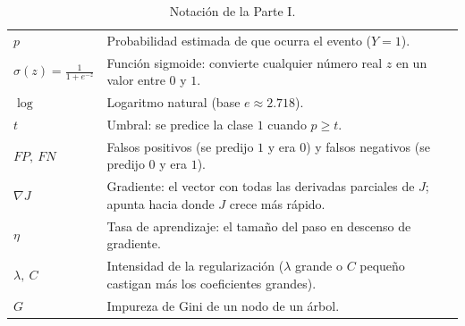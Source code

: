 \begin{table}[H]
\begin{tabular}{>{\raggedright\arraybackslash}p{3.2cm}>{\raggedright\arraybackslash}p{11.3cm}}
$p$ & Probabilidad estimada de que ocurra el evento ($Y=1$). \\
$\sigma(z)=\frac{1}{1+e^{-z}}$ & Función sigmoide: convierte cualquier
número real $z$ en un valor entre $0$ y $1$. \\
$\log$ & Logaritmo natural (base $e\approx2.718$). \\
$t$ & Umbral: se predice la clase $1$ cuando $p\ge t$. \\
$FP,\ FN$ & Falsos positivos (se predijo $1$ y era $0$) y falsos negativos
(se predijo $0$ y era $1$). \\
$\nabla J$ & Gradiente: el vector con todas las derivadas parciales de
$J$; apunta hacia donde $J$ crece más rápido. \\
$\eta$ & Tasa de aprendizaje: el tamaño del paso en descenso de gradiente. \\
$\lambda,\ C$ & Intensidad de la regularización ($\lambda$ grande o $C$
pequeño castigan más los coeficientes grandes). \\
$G$ & Impureza de Gini de un nodo de un árbol. \\
\bottomrule
\end{tabular}
\caption{Notación de la Parte I.}
\label{tab:notacion}
\end{table}
